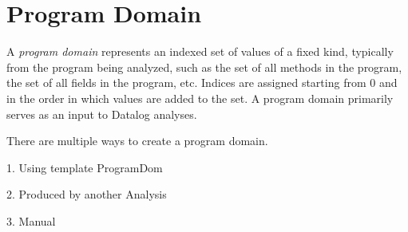 \chapter{Program Domain}
\label{chap:domain}

A {\it program domain} represents an indexed set of values of a fixed
kind, typically from the program being analyzed, such as the set of all methods
in the program, the set of all fields in the program, etc.  Indices are
assigned starting from 0 and in the order in which values are added to the set.
A program domain primarily serves as an input to Datalog analyses.

There are multiple ways to create a program domain.

1. Using template ProgramDom

2. Produced by another Analysis

3. Manual

